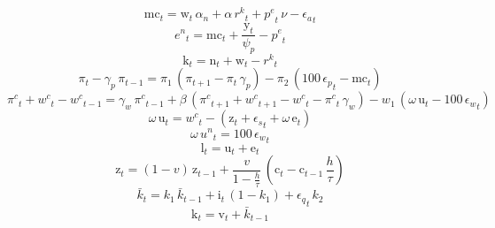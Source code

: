 \begin{dmath}
{{\mathrm{mc}}}_{t}={{\mathrm{w}}}_{t}\, {{\alpha_{n}}}+{{\alpha}}\, {{r^{k}}}_{t}+{{p^{e}}}_{t}\, {{\nu}}-{{\epsilon_{a}}}_{t}
\end{dmath}
\begin{dmath}
{{e^{n}}}_{t}={{\mathrm{mc}}}_{t}+\frac{{{\mathrm{y}}}_{t}}{{{\psi_{p}}}}-{{p^{e}}}_{t}
\end{dmath}
\begin{dmath}
{{\mathrm{k}}}_{t}={{\mathrm{n}}}_{t}+{{\mathrm{w}}}_{t}-{{r^{k}}}_{t}
\end{dmath}
\begin{dmath}
{{\pi}}_{t}-{{\gamma_{p}}}\, {{\pi}}_{t-1}={{\pi_{1}}}\, \left({{\pi}}_{t+1}-{{\pi}}_{t}\, {{\gamma_{p}}}\right)-{{\pi_{2}}}\, \left(100\, {{\epsilon_{p}}}_{t}-{{\mathrm{mc}}}_{t}\right)
\end{dmath}
\begin{dmath}
{{\pi^{c}}}_{t}+{{w^{c}}}_{t}-{{w^{c}}}_{t-1}={{\gamma_{w}}}\, {{\pi^{c}}}_{t-1}+{{\beta}}\, \left({{\pi^{c}}}_{t+1}+{{w^{c}}}_{t+1}-{{w^{c}}}_{t}-{{\pi^{c}}}_{t}\, {{\gamma_{w}}}\right)-{{w_{1}}}\, \left({{\omega}}\, {{\mathrm{u}}}_{t}-100\, {{\epsilon_{w}}}_{t}\right)
\end{dmath}
\begin{dmath}
{{\omega}}\, {{\mathrm{u}}}_{t}={{w^{c}}}_{t}-\left({{\mathrm{z}}}_{t}+{{\epsilon_{s}}}_{t}+{{\omega}}\, {{\mathrm{e}}}_{t}\right)
\end{dmath}
\begin{dmath}
{{\omega}}\, {{u^{n}}}_{t}=100\, {{\epsilon_{w}}}_{t}
\end{dmath}
\begin{dmath}
{{\mathrm{l}}}_{t}={{\mathrm{u}}}_{t}+{{\mathrm{e}}}_{t}
\end{dmath}
\begin{dmath}
{{\mathrm{z}}}_{t}=\left(1-{{v}}\right)\, {{\mathrm{z}}}_{t-1}+\frac{{{v}}}{1-\frac{{{h}}}{{{\tau}}}}\, \left({{\mathrm{c}}}_{t}-{{\mathrm{c}}}_{t-1}\, \frac{{{h}}}{{{\tau}}}\right)
\end{dmath}
\begin{dmath}
{{\bar{k}}}_{t}={{k_{1}}}\, {{\bar{k}}}_{t-1}+{{\mathrm{i}}}_{t}\, \left(1-{{k_{1}}}\right)+{{\epsilon_{q}}}_{t}\, {{k_{2}}}
\end{dmath}
\begin{dmath}
{{\mathrm{k}}}_{t}={{\mathrm{v}}}_{t}+{{\bar{k}}}_{t-1}
\end{dmath}
